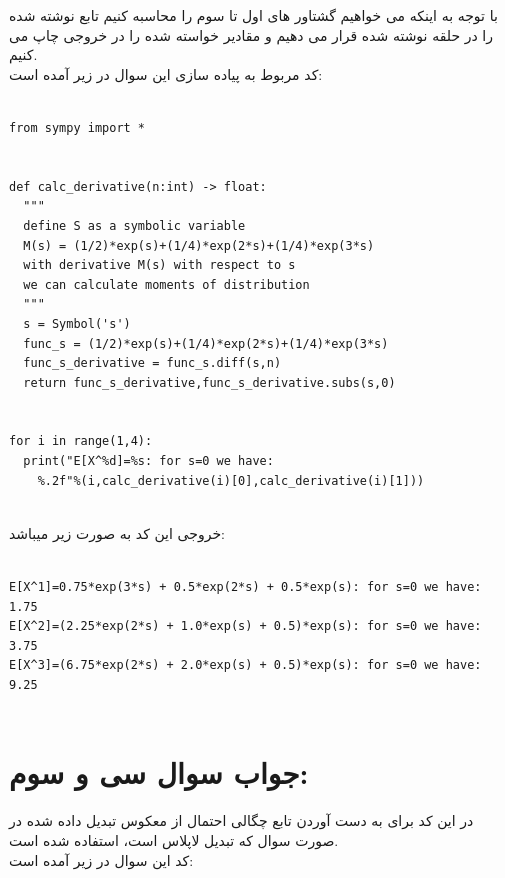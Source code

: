 \documentclass[a4paper,14pt]{article}
\begin{document}
با توجه به اینکه می خواهیم گشتاور های اول تا سوم را محاسبه کنیم تابع نوشته شده را در حلقه 
نوشته شده قرار می دهیم و مقادیر خواسته شده را  در خروجی چاپ می کنیم.\\

کد مربوط به پیاده سازی این سوال در زیر آمده است:\\

\fontsize{12}{12}\selectfont
\begin{latin}
	\begin{lstlisting}
		
from sympy import *


def calc_derivative(n:int) -> float:
  """
  define S as a symbolic variable
  M(s) = (1/2)*exp(s)+(1/4)*exp(2*s)+(1/4)*exp(3*s)
  with derivative M(s) with respect to s
  we can calculate moments of distribution
  """
  s = Symbol('s')
  func_s = (1/2)*exp(s)+(1/4)*exp(2*s)+(1/4)*exp(3*s)
  func_s_derivative = func_s.diff(s,n)
  return func_s_derivative,func_s_derivative.subs(s,0)


for i in range(1,4):
  print("E[X^%d]=%s: for s=0 we have: 
    %.2f"%(i,calc_derivative(i)[0],calc_derivative(i)[1]))
		
	\end{lstlisting}
\end{latin}
\fontsize{14}{14}\selectfont

خروجی این کد به  صورت زیر میباشد:\\

\fontsize{12}{12}\selectfont
\begin{latin}
	\begin{lstlisting}
		
E[X^1]=0.75*exp(3*s) + 0.5*exp(2*s) + 0.5*exp(s): for s=0 we have: 1.75
E[X^2]=(2.25*exp(2*s) + 1.0*exp(s) + 0.5)*exp(s): for s=0 we have: 3.75
E[X^3]=(6.75*exp(2*s) + 2.0*exp(s) + 0.5)*exp(s): for s=0 we have: 9.25
		
	\end{lstlisting}
\end{latin}
\fontsize{14}{14}\selectfont

\section*{جواب سوال سی و سوم:}
در این کد برای به دست آوردن تابع چگالی احتمال از معکوس تبدیل داده شده در صورت سوال که تبدیل لاپلاس است، استفاده شده است.\\

کد این سوال در زیر آمده است:\\
\end{document}
